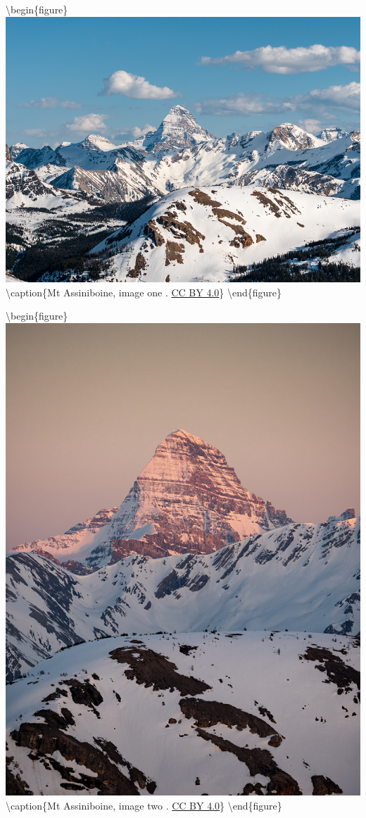 \documentclass[
]{book}
\begin{document}
\textbackslash begin\{figure\}
\includegraphics[width=0.9\linewidth]{images/12-assiniboine_day} \textbackslash caption\{Mt Assiniboine, image one \citep{maguire_mt_nodate}. \href{https://creativecommons.org/licenses/by/4.0/}{CC BY 4.0}\}\label{fig:12-assiniboine-day}
\textbackslash end\{figure\}

\textbackslash begin\{figure\}
\includegraphics[width=0.9\linewidth]{images/12-assiniboine_sunset} \textbackslash caption\{Mt Assiniboine, image two \citep{maguire_mt_nodate-1}. \href{https://creativecommons.org/licenses/by/4.0/}{CC BY 4.0}\}\label{fig:12-assiniboine-sunset}
\textbackslash end\{figure\}
\end{document}
